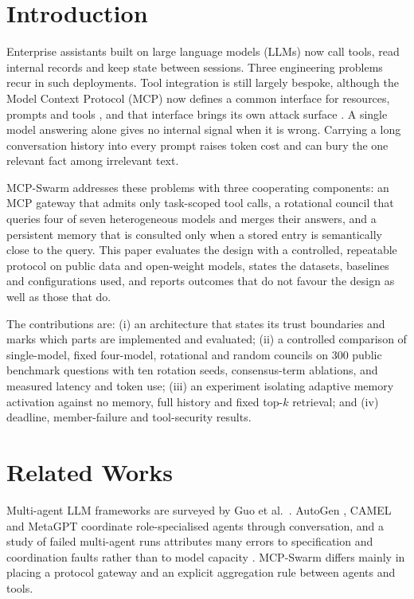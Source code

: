 \section{Introduction}
Enterprise assistants built on large language models (LLMs) now call tools, read internal records and keep state between sessions. Three engineering problems recur in such deployments. Tool integration is still largely bespoke, although the Model Context Protocol (MCP) now defines a common interface for resources, prompts and tools \cite{mcpspec}, and that interface brings its own attack surface \cite{hou2025mcp}. A single model answering alone gives no internal signal when it is wrong. Carrying a long conversation history into every prompt raises token cost and can bury the one relevant fact among irrelevant text.

MCP-Swarm addresses these problems with three cooperating components: an MCP gateway that admits only task-scoped tool calls, a rotational council that queries four of seven heterogeneous models and merges their answers, and a persistent memory that is consulted only when a stored entry is semantically close to the query. This paper evaluates the design with a controlled, repeatable protocol on public data and open-weight models, states the datasets, baselines and configurations used, and reports outcomes that do not favour the design as well as those that do.

The contributions are: (i) an architecture that states its trust boundaries and marks which parts are implemented and evaluated; (ii) a controlled comparison of single-model, fixed four-model, rotational and random councils on 300 public benchmark questions with ten rotation seeds, consensus-term ablations, and measured latency and token use; (iii) an experiment isolating adaptive memory activation against no memory, full history and fixed top-$k$ retrieval; and (iv) deadline, member-failure and tool-security results.

\section{Related Works}
Multi-agent LLM frameworks are surveyed by Guo et al.\ \cite{guo2024survey}. AutoGen \cite{wu2023autogen}, CAMEL \cite{li2023camel} and MetaGPT \cite{hong2023metagpt} coordinate role-specialised agents through conversation, and a study of failed multi-agent runs attributes many errors to specification and coordination faults rather than to model capacity \cite{cemri2025fail}. MCP-Swarm differs mainly in placing a protocol gateway and an explicit aggregation rule between agents and tools.

